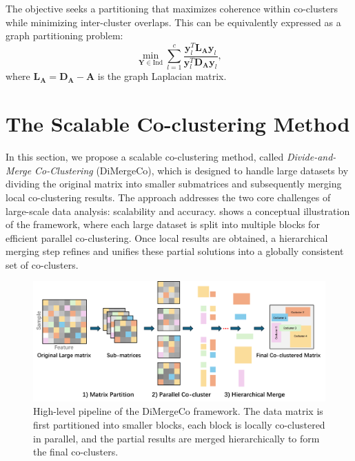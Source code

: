 \documentclass[journal]{IEEEtran}
\begin{document}
The objective seeks a partitioning that maximizes coherence within co-clusters while minimizing inter-cluster overlaps. This can be equivalently expressed as a graph partitioning problem:
\begin{equation}
    \min_{\mathbf{Y} \in \text{Ind}} \sum_{l=1}^c \frac{\mathbf{y}_l^T \mathbf{L}_\mathbf{A}\mathbf{y}_l}{\mathbf{y}_l^T \mathbf{D}_\mathbf{A} \mathbf{y}_l},
\end{equation}
where $\mathbf{L}_\mathbf{A} = \mathbf{D}_\mathbf{A} - \mathbf{A}$ is the graph Laplacian matrix.

\section{The Scalable Co-clustering Method}
\label{sec:proposed_model}

In this section, we propose a scalable co-clustering method, called \emph{Divide-and-Merge Co-Clustering } (DiMergeCo), which is designed to handle large datasets by dividing the original matrix into smaller submatrices and subsequently merging local co-clustering results. The approach addresses the two core challenges of large-scale data analysis: scalability and accuracy.  shows a conceptual illustration of the framework, where each large dataset is split into multiple blocks for efficient parallel co-clustering. Once local results are obtained, a hierarchical merging step refines and unifies these partial solutions into a globally consistent set of co-clusters.

\begin{figure}[t]
    \centering
    \includegraphics[width=0.8\linewidth]{workflow.png} %
    \caption{High-level pipeline of the DiMergeCo framework. The data matrix is first partitioned into smaller blocks, each block is locally co-clustered in parallel, and the partial results are merged hierarchically to form the final co-clusters.}
    \label{fig:DiMergeCo_pipeline}
\end{figure}
\end{document}

